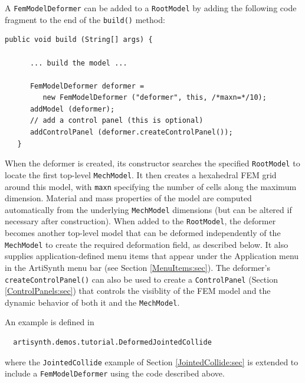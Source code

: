 A {\tt FemModelDeformer} can be added to a {\tt RootModel} by adding
the following code fragment to the end of the {\tt build()} method:
%
\begin{lstlisting}[]
   public void build (String[] args) {

      ... build the model ...

      FemModelDeformer deformer =
         new FemModelDeformer ("deformer", this, /*maxn=*/10);
      addModel (deformer);
      // add a control panel (this is optional)
      addControlPanel (deformer.createControlPanel());  
   }
\end{lstlisting}
%
When the deformer is created, its constructor searches the specified
{\tt RootModel} to locate the first top-level {\tt MechModel}. It then
creates a hexahedral FEM grid around this model, with {\tt maxn} specifying
the number of cells along the maximum dimension. Material and
mass properties of the model are computed automatically from the
underlying {\tt MechModel} dimensions (but can be altered if necessary after
construction). When added to the {\tt RootModel},
the deformer becomes another top-level model that can be deformed
independently of the {\tt MechModel} to create the required
deformation field, as described below. It also supplies application-defined
menu items that appear under the {\sf Application} menu in the ArtiSynth
menu bar (see Section \ref{MenuItems:sec}). 
The deformer's {\tt createControlPanel()} can also be used
to create a {\tt ControlPanel} (Section \ref{ControlPanels:sec}) that
controls the visiblity of the FEM model and the dynamic behavior of
both it and the {\tt MechModel}.

An example is defined in 
%
\begin{verbatim}
  artisynth.demos.tutorial.DeformedJointedCollide
\end{verbatim}
%
where the {\tt JointedCollide} example of Section
\ref{JointedCollide:sec} is extended to include a 
{\tt FemModelDeformer} using the code described above.

